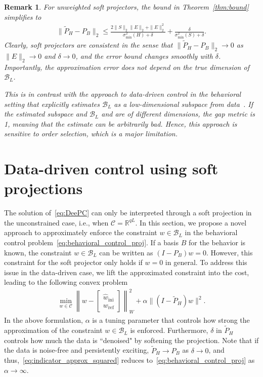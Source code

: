 \documentclass[letterpaper, 10 pt, conference]{ieeeconf}
\newtheorem{rmk}{Remark}
\begin{document}
\begin{rmk} \label{rmk:unweighted_bound}
For unweighted soft projectors, the bound in Theorem~\ref{thm:bound} simplifies to
\begin{align} \label{eq:bound_unweighted}
        \|\tilde{P}_H - P_B\|_2 \leq \frac{2\|S\|_2\|E\|_2 + \|E\|_2^2}{\sigma_\mathrm{min}^2(H) + \delta} + \frac{\delta}{\sigma^2_\mathrm{min}(S)+ \delta}.
\end{align}
Clearly, soft projectors are consistent in the sense that $\|\tilde{P}_H - P_B\|_2 \to 0$ as $\|E\|_2 \to 0$ and $\delta\to0$, and the error bound changes smoothly with $\delta$.
Importantly, the approximation error does not depend on the true dimension of $\mathcal{B}_L$.


This is in contrast with the approach to data-driven control in the behavioral setting that explicitly estimates $\mathcal{B}_L$ as a low-dimensional subspace from data~\cite{sasfi2025great,bharadwaj2025robust,jin2026sensitivitysubspacepredictorbehavioral}.
If the estimated subspace and $\mathcal{B}_L$ and are of different dimensions, the gap metric is 1, meaning that the estimate can be arbitrarily bad.
Hence, this approach is sensitive to order selection, which is a major limitation. \hfill \QED
\end{rmk}


\section{Data-driven control using soft projections} \label{sec:novel_methods}
The solution of~\eqref{eq:DeePC} can only be interpreted through a soft projection in the unconstrained case, i.e., when $\mathcal{C} = \mathbb{R}^{qL}$.
In this section, we propose a novel approach to approximately enforce the constraint $w \in \mathcal{B}_L$ in the behavioral control problem~\eqref{eq:behavioral_control_proj}.
If a basis $B$ for the behavior is known, the constraint $w \in \mathcal{B}_L$ can be written as $(I - P_B) w = 0$.
However, this constraint for the soft projector only holds if $w=0$ in general.
To address this issue in the data-driven case, we lift the approximated constraint into the cost, leading to the following convex problem
\begin{align} \label{eq:indicator_approx_squared}
     \min_{w\in\mathcal{C}} \left \|w - \begin{bmatrix}
    \hat{w}_\mathrm{ini} \\ w_\mathrm{ref}
    \end{bmatrix}\right \|^2_{W} + \alpha \|(I - \tilde{P}_H)w\|^2. 
\end{align}
In the above formulation, $\alpha$ is a tuning parameter that controls how strong the approximation of the constraint $w\in\mathcal{B}_L$ is enforced.
Furthermore, $\delta$ in $\tilde{P}_H$ controls how much the data is ``denoised" by softening the projection.
Note that if the data is noise-free and persistently exciting, $\tilde{P}_H\to P_B$ as $\delta\to0$, and thus,~\eqref{eq:indicator_approx_squared} reduces to~\eqref{eq:behavioral_control_proj} as $\alpha\to\infty$. 
\end{document}
